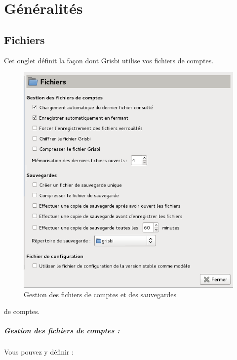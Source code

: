 \section{Généralités\label{setup-general}}


\subsection{Fichiers\label{setup-general-files}}

Cet onglet définit la façon dont Grisbi utilise vos fichiers \ifIllustration de comptes.

\begin{figure}[htbp]
\begin{center}
\includegraphics[scale=0.5]{image/screenshot/setup_files}
\end{center}
\caption{Gestion des fichiers de comptes et des sauvegardes}
\label{setup-files-img}
\end{figure}
\else de comptes.
\fi


\subparagraph{Gestion des fichiers de comptes :\label{setup-general-files-manage}}

Vous pouvez y définir :

